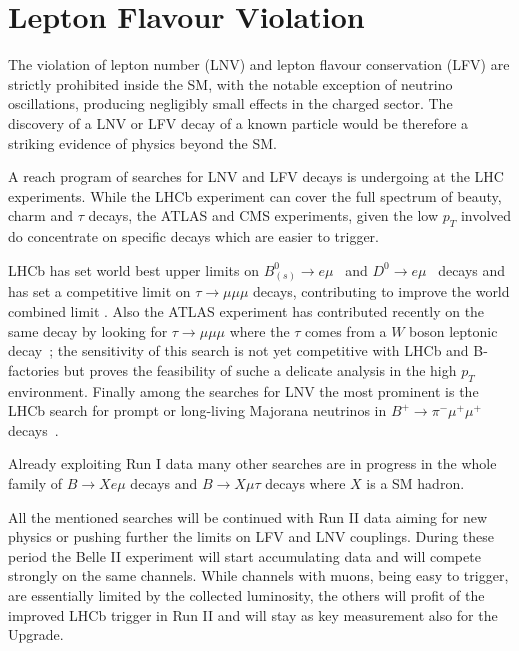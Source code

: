 \section{Lepton Flavour Violation}

The violation of lepton number (LNV) and lepton flavour conservation (LFV) are strictly prohibited
inside the SM, with the notable exception of neutrino oscillations, producing negligibly 
small effects in the charged sector. 
The discovery of a LNV or LFV decay of a known particle would be therefore a striking evidence 
of physics beyond the SM. 

A reach program of searches for LNV and LFV decays is undergoing at the LHC experiments. 
While the LHCb experiment can cover the full spectrum of beauty, charm and $\tau$ decays, 
the ATLAS and CMS experiments, given the low $p_T$ involved do concentrate on specific decays which are easier to trigger. 

LHCb has set world best upper limits on $B^0_{(s)} \to e \mu$~\cite{Aaij:2013cby} 
and $D^0 \to e \mu$~\cite{Aaij:2015qmj} decays and has set a competitive
limit on $\tau \to \mu\mu\mu$ decays, contributing to improve the world combined limit \cite{Aaij:2014azz}. 
Also the ATLAS experiment has contributed recently on the same decay by looking for $\tau \to \mu\mu\mu$
where the $\tau$ comes from a $W$ boson leptonic decay~\cite{Aad:2016wce}; the sensitivity of this search is not yet 
competitive with LHCb and B-factories but proves the feasibility of suche a delicate analysis in the high $p_T$ 
environment. 
Finally among the searches for LNV the most prominent is the LHCb search for prompt or long-living Majorana neutrinos 
in $B^+\to \pi^- \mu^+ \mu^+$ decays~\cite{Aaij:2012zr}.

Already exploiting Run I data many other searches are in progress in the whole family of $B\to X e\mu$ decays and 
$B\to X \mu\tau$ decays where $X$ is a SM hadron. 

All the mentioned searches will be continued with Run II data aiming for new physics or pushing further the limits on 
LFV and LNV couplings. 
During these period the Belle II experiment will start accumulating data and will compete strongly on the same channels. 
While channels with muons, being easy to trigger, are essentially limited by the collected luminosity, the others will
profit of the improved LHCb trigger in Run II and will stay as key measurement also for the Upgrade. 


